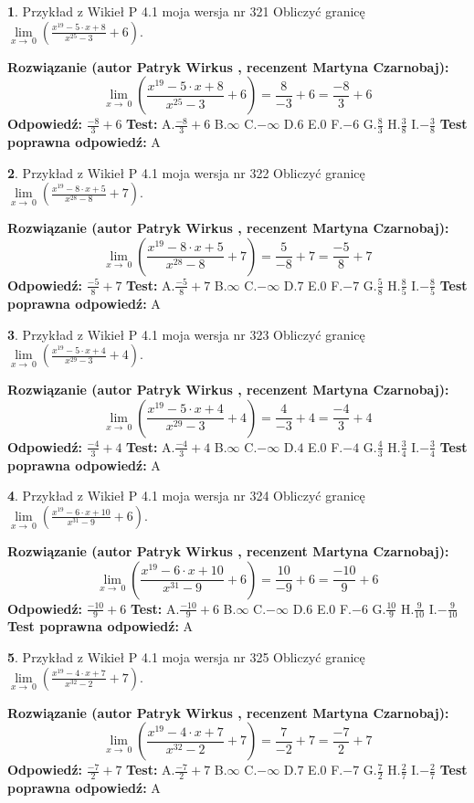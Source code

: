 \documentclass[12pt, a4paper]{article}
\theoremstyle{definition} %
\newtheorem{zad}{}
\newcommand{\zadStart}[1]{\begin{zad}#1\newline}
\newcommand{\zadStop}{\end{zad}}
\newcommand{\rozwStart}[2]{\noindent \textbf{Rozwiązanie (autor #1 , recenzent #2): }\newline}
\newcommand{\rozwStop}{\newline}
\newcommand{\odpStart}{\noindent \textbf{Odpowiedź:}\newline}
\newcommand{\odpStop}{\newline}
\newcommand{\testStart}{\noindent \textbf{Test:}\newline}
\newcommand{\testStop}{\newline}
\newcommand{\kluczStart}{\noindent \textbf{Test poprawna odpowiedź:}\newline}
\newcommand{\kluczStop}{\newline}
\begin{document}
\zadStart{Przykład z Wikieł P 4.1 moja wersja nr 321}
Obliczyć granicę $\lim\limits_{x\to\ 0}(\frac{x^{19}-5 \cdot x +8}{x^{25}-3}+6)$.
\zadStop
\rozwStart{Patryk Wirkus}{Martyna Czarnobaj}
$$\lim\limits_{x\to\ 0}(\frac{x^{19}-5 \cdot x +8}{x^{25}-3}+6)=\frac{8}{-3}+6=\frac{-8}{3}+6$$
\rozwStop
\odpStart
$\frac{-8}{3}+6$
\odpStop
\testStart
A.$\frac{-8}{3}+6$
B.$\infty$
C.$-\infty$
D.$6$
E.$0$
F.$-6$
G.$\frac{8}{3}$
H.$\frac{3}{8}$
I.$-\frac{3}{8}$
\testStop
\kluczStart
A
\kluczStop



\zadStart{Przykład z Wikieł P 4.1 moja wersja nr 322}
Obliczyć granicę $\lim\limits_{x\to\ 0}(\frac{x^{19}-8 \cdot x +5}{x^{28}-8}+7)$.
\zadStop
\rozwStart{Patryk Wirkus}{Martyna Czarnobaj}
$$\lim\limits_{x\to\ 0}(\frac{x^{19}-8 \cdot x +5}{x^{28}-8}+7)=\frac{5}{-8}+7=\frac{-5}{8}+7$$
\rozwStop
\odpStart
$\frac{-5}{8}+7$
\odpStop
\testStart
A.$\frac{-5}{8}+7$
B.$\infty$
C.$-\infty$
D.$7$
E.$0$
F.$-7$
G.$\frac{5}{8}$
H.$\frac{8}{5}$
I.$-\frac{8}{5}$
\testStop
\kluczStart
A
\kluczStop



\zadStart{Przykład z Wikieł P 4.1 moja wersja nr 323}
Obliczyć granicę $\lim\limits_{x\to\ 0}(\frac{x^{19}-5 \cdot x +4}{x^{29}-3}+4)$.
\zadStop
\rozwStart{Patryk Wirkus}{Martyna Czarnobaj}
$$\lim\limits_{x\to\ 0}(\frac{x^{19}-5 \cdot x +4}{x^{29}-3}+4)=\frac{4}{-3}+4=\frac{-4}{3}+4$$
\rozwStop
\odpStart
$\frac{-4}{3}+4$
\odpStop
\testStart
A.$\frac{-4}{3}+4$
B.$\infty$
C.$-\infty$
D.$4$
E.$0$
F.$-4$
G.$\frac{4}{3}$
H.$\frac{3}{4}$
I.$-\frac{3}{4}$
\testStop
\kluczStart
A
\kluczStop



\zadStart{Przykład z Wikieł P 4.1 moja wersja nr 324}
Obliczyć granicę $\lim\limits_{x\to\ 0}(\frac{x^{19}-6 \cdot x +10}{x^{31}-9}+6)$.
\zadStop
\rozwStart{Patryk Wirkus}{Martyna Czarnobaj}
$$\lim\limits_{x\to\ 0}(\frac{x^{19}-6 \cdot x +10}{x^{31}-9}+6)=\frac{10}{-9}+6=\frac{-10}{9}+6$$
\rozwStop
\odpStart
$\frac{-10}{9}+6$
\odpStop
\testStart
A.$\frac{-10}{9}+6$
B.$\infty$
C.$-\infty$
D.$6$
E.$0$
F.$-6$
G.$\frac{10}{9}$
H.$\frac{9}{10}$
I.$-\frac{9}{10}$
\testStop
\kluczStart
A
\kluczStop



\zadStart{Przykład z Wikieł P 4.1 moja wersja nr 325}
Obliczyć granicę $\lim\limits_{x\to\ 0}(\frac{x^{19}-4 \cdot x +7}{x^{32}-2}+7)$.
\zadStop
\rozwStart{Patryk Wirkus}{Martyna Czarnobaj}
$$\lim\limits_{x\to\ 0}(\frac{x^{19}-4 \cdot x +7}{x^{32}-2}+7)=\frac{7}{-2}+7=\frac{-7}{2}+7$$
\rozwStop
\odpStart
$\frac{-7}{2}+7$
\odpStop
\testStart
A.$\frac{-7}{2}+7$
B.$\infty$
C.$-\infty$
D.$7$
E.$0$
F.$-7$
G.$\frac{7}{2}$
H.$\frac{2}{7}$
I.$-\frac{2}{7}$
\testStop
\kluczStart
A
\kluczStop
\end{document}
